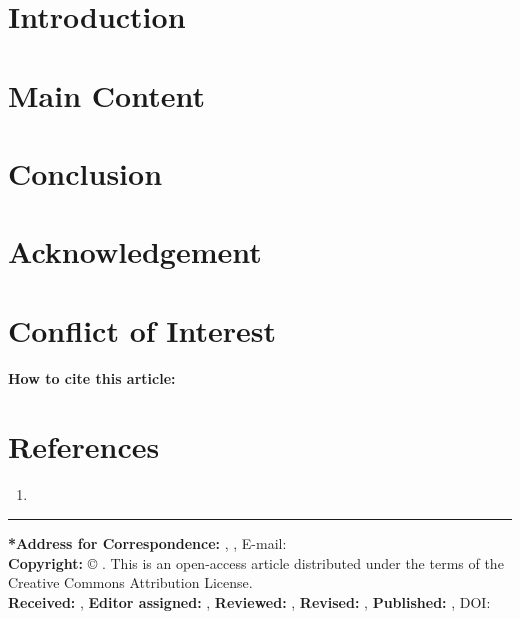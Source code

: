 \documentclass{article}
\begin{document}
\begin{multicols}{2}
\fontsize{9}{10.8}\selectfont\color{color_29791}

\section*{\color{color_100238}Introduction}

\section*{\color{color_100238}Main Content}

\section*{\color{color_100238}Conclusion}

\section*{\color{color_100238}Acknowledgement}

\section*{\color{color_100238}Conflict of Interest}

\begin{framed}
\noindent\fontsize{8.5}{10.2}\selectfont
\textbf{How to cite this article:} 
\end{framed}

\section*{\color{color_100238}References}
\fontsize{8}{9.6}\selectfont
\begin{enumerate}
    \item {}
\end{enumerate}
\end{multicols}

\vfill
\noindent
\hspace*{0pt}\color{color_100238}\rule{\textwidth}{1pt}
\par\vspace{0.3cm}

\fontsize{8.5}{10.2}\selectfont
\color{color_100238}\textbf{*Address for Correspondence:} 
\color{color_29791}, , 
E-mail: \href{mailto:\VAR{email}}{} \\

\color{color_100238}\textbf{Copyright:} 
\color{color_29791}©  . This is an open-access article distributed under the terms of the Creative Commons Attribution License. \\

\vspace{0.1cm}
\color{color_29791}\textbf{Received:} , 
\textbf{Editor assigned:} , 
\textbf{Reviewed:} , 
\textbf{Revised:} , 
\textbf{Published:} , 
DOI: \href{\VAR{doi}}{}
\end{document}
